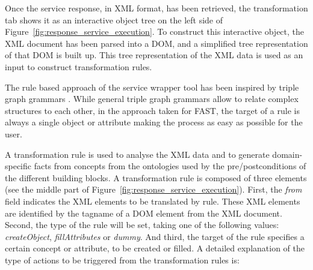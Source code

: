\documentclass{fast_latex}
\begin{document}
Once the service response, in XML format, has been retrieved, the transformation tab shows it as an interactive object tree on the left side of Figure~\ref{fig:response_service_execution}. To construct this interactive object, the XML document has been parsed into a DOM, and a simplified tree representation of that DOM is built up. This tree representation of the XML data is used as an input to construct transformation rules.

The rule based approach of the service wrapper tool has been inspired by triple graph grammars \cite{Schurr94,JSZ97c}. While general triple graph grammars allow to relate complex structures to each other, in the approach taken for FAST, the target of a rule is always a single object or attribute making the process as easy as possible for the user.

A transformation rule is used to analyse the XML data and to generate domain-specific facts from concepts from the ontologies used by the pre/postconditions of the different building blocks. A transformation rule is composed of three elements (see the middle part of Figure~\ref{fig:response_service_execution}). First, the \textit{from} field indicates the XML elements to be translated by rule. These XML elements are identified by the tagname of a DOM element from the XML document. Second, the type of the rule will be set, taking one of the following values: \emph{createObject}, \emph{fillAttributes} or \emph{dummy}. And third, the target of the rule specifies a certain concept or attribute, to be created or filled. A detailed explanation of the type of actions to be triggered from the transformation rules is:
\end{document}
